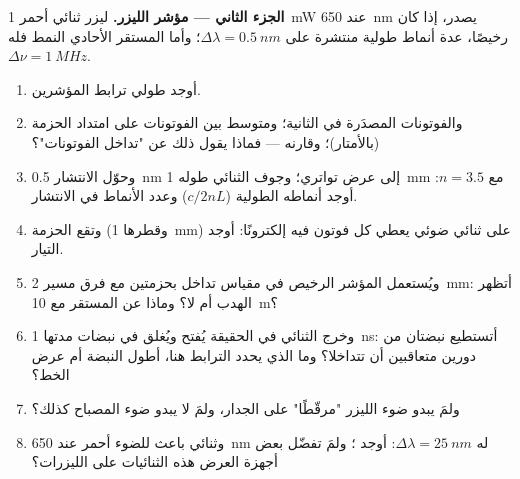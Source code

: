 \begin{problem}
\medskip
\noindent\textbf{الجزء الثاني --- مؤشر الليزر.}
ليزر ثنائي أحمر \qty{1}{mW} عند \qty{650}{nm} يصدر، إذا كان رخيصًا، عدة
أنماط طولية منتشرة على $\Delta\lambda = \qty{0.5}{nm}$؛ وأما المستقر
الأحادي النمط فله $\Delta\nu = \qty{1}{MHz}$.
\begin{enumerate}[resume]
  \item أوجد طولي ترابط المؤشرين.
  \item والفوتونات المصدَرة في الثانية؛ ومتوسط  بين الفوتونات على
        امتداد الحزمة (بالأمتار)؛ وقارنه  ---
        فماذا يقول ذلك عن "تداخل الفوتونات"؟
  \item وحوّل الانتشار \qty{0.5}{nm} إلى عرض تواتري؛ وجوف
        الثنائي طوله \qty{1}{mm} مع $n = 3.5$: أوجد  أنماطه
        الطولية ($c/2nL$) وعدد الأنماط في الانتشار.
  \item وتقع الحزمة (وقطرها \qty{1}{mm}) على ثنائي ضوئي يعطي
        كل فوتون فيه إلكترونًا: أوجد التيار.
  \item ويُستعمل المؤشر الرخيص في مقياس تداخل بحزمتين مع
        فرق مسير \qty{2}{mm}: أتظهر الهدب أم لا؟ وماذا عن المستقر
        مع \qty{10}{m}؟
  \item وخرج الثنائي في الحقيقة يُفتح ويُغلق في
        نبضات مدتها \qty{1}{ns}: أتستطيع نبضتان من دورين متعاقبين
        أن تتداخلا؟ وما الذي يحدد الترابط هنا، أطول النبضة
        أم عرض الخط؟
  \item ولمَ يبدو ضوء الليزر "مرقّطًا" على الجدار، ولمَ
        لا يبدو ضوء المصباح كذلك؟
  \item وثنائي باعث للضوء أحمر عند \qty{650}{nm} له $\Delta\lambda = \qty{25}{nm}$: أوجد ؛ ولمَ تفضّل بعض أجهزة العرض هذه الثنائيات على الليزرات؟
\end{enumerate}


\end{problem}
